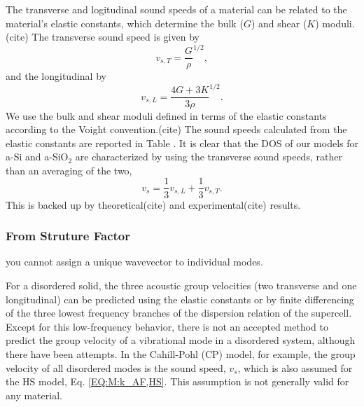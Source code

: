 \documentclass[aps,prb,twocolumn,superscriptaddress,footinbib,amsmath,amssymb,floatfix]{revtex4}
\begin{document}
{The transverse and logitudinal sound speeds of a material can be related 
to the material's elastic constants, which determine the bulk ($G$) and 
shear ($K$) moduli.(cite) The transverse sound speed is given by 
\begin{equation}\label{EQ:Dynamical}
v_{s,T} = \frac{G}{\rho}^{1/2},
\end{equation}
and the longitudinal by
\begin{equation}\label{EQ:Dynamical}
v_{s,L} = \frac{4G + 3K}{3\rho}^{1/2}.
\end{equation}
We use the bulk and shear moduli defined in terms of the elastic 
constants according to the Voight convention.(cite) 
The sound speeds calculated from the 
elastic constants are reported in Table . It is clear that the DOS of 
our models for a-Si and a-SiO$_2$ are characterized by using the 
transverse sound speeds, rather than an averaging of the two, 
\begin{equation}\label{EQ:Dynamical}
v_{s} = \frac{1}{3}v_{s,L} + \frac{1}{3}v_{s,T}. 
\end{equation}
This is backed up by theoretical(cite) and experimental(cite) results. 



\subsubsection{\label{S:Structure}From Struture Factor}

you cannot assign a unique wavevector to individual modes.
\cite{biswas_vibrational_1988}

For a disordered solid, the three acoustic group 
velocities (two transverse and one 
longitudinal) can be predicted using the elastic constants
\cite{gale_general_2003} 
or by finite differencing of the three lowest frequency branches 
of the dispersion relation of the supercell.
\cite{he_thermal_2011,he_heat_2011} 
Except for this low-frequency behavior, there is not an 
accepted method to predict the group velocity of a 
vibrational mode in a disordered system, although there have been 
attempts.
\cite{cahill_lattice_1988,duda_reducing_2011,donadio_atomistic_2009,
he_heat_2011,he_thermal_2011} 
In the Cahill-Pohl (CP) model, for example, the group velocity of 
all disordered modes is the sound speed, $v_s$, which is also assumed  
for the HS model, Eq. \eqref{EQ:M:k_AF,HS}.
\cite{cahill_lattice_1988} This assumption is not generally valid  
for any material.\cite{feldman_numerical_1999,duda_reducing_2011,
donadio_atomistic_2009,he_heat_2011,he_thermal_2011}

}
\end{document}
